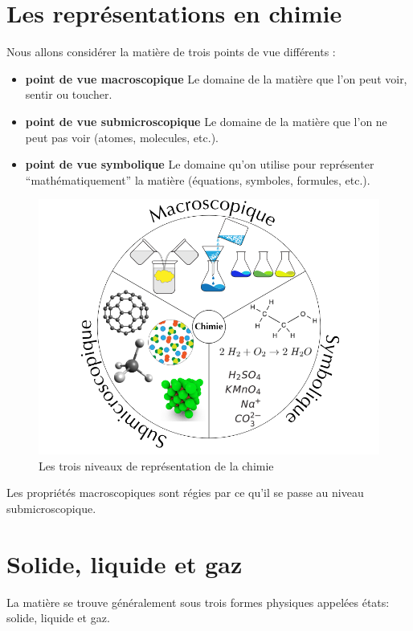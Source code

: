\documentclass[
  11pt,
  french,
  a4paper,
  openany]{book}
\providecommand{\tightlist}{%
  \setlength{\itemsep}{0pt}\setlength{\parskip}{0pt}}
\begin{document}
\hypertarget{les-repruxe9sentations-en-chimie}{%
\section{Les représentations en chimie}\label{les-repruxe9sentations-en-chimie}}

Nous allons considérer la matière de trois points de vue différents :

\begin{itemize}
\tightlist
\item
  \textbf{point de vue macroscopique}
  Le domaine de la matière que l'on peut voir, sentir ou toucher.
\item
  \textbf{point de vue submicroscopique}
  Le domaine de la matière que l'on ne peut pas voir (atomes, molecules, etc.).
\item
  \textbf{point de vue symbolique}
  Le domaine qu'on utilise pour représenter ``mathématiquement'' la matière (équations, symboles, formules, etc.).
\end{itemize}

\begin{figure}

{\centering \includegraphics[width=0.5\linewidth]{images/Johnstone} 

}

\caption{Les trois niveaux de représentation de la chimie}\label{fig:Johnstone}
\end{figure}

Les propriétés macroscopiques sont régies par ce qu'il se passe au niveau submicroscopique.

\hypertarget{solide-liquide-et-gaz}{%
\section{Solide, liquide et gaz}\label{solide-liquide-et-gaz}}

La matière se trouve généralement sous trois formes physiques appelées états: solide, liquide et gaz.
\end{document}
